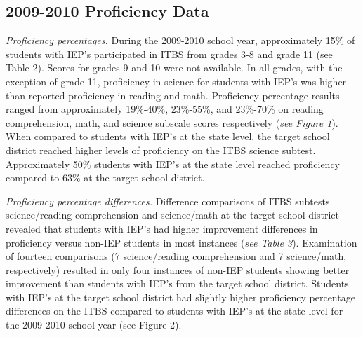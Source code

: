 \documentclass[11.5pt]{sig-alternate} %
\begin{document}
\begin{large}
\subsection*{2009-2010 Proficiency Data}
\textit{Proficiency percentages.} During the 2009-2010 school year, approximately 15\% of students with IEP’s participated in ITBS from grades 3-8 and grade 11 (see Table 2). Scores for grades 9 and 10 were not available. In all grades, with the exception of grade 11, proficiency in science for students with IEP’s was higher than reported proficiency in reading and math. Proficiency percentage results ranged from approximately 19\%-40\%, 23\%-55\%, and 23\%-70\% on reading comprehension, math, and science subscale scores respectively (\textit{see Figure 1}). When compared to students with IEP’s at the state level, the target school district reached higher levels of proficiency on the ITBS science subtest. Approximately 50\% students with IEP’s at the state level reached proficiency compared to 63\% at the target school district.

\textit{Proficiency percentage differences.} Difference comparisons of ITBS subtests science/reading comprehension and science/math at the target school district revealed that students with IEP’s had higher improvement differences in proficiency versus non-IEP students in most instances (\textit{see Table 3}). Examination of fourteen comparisons (7 science/reading comprehension and 7 science/math, respectively) resulted in only four instances of non-IEP students showing better improvement than students with IEP’s from the target school district. Students with IEP’s at the target school district had slightly higher proficiency percentage differences on the ITBS compared to students with IEP’s at the state level for the 2009-2010 school year (see Figure 2).


\end{large}
\end{document}
